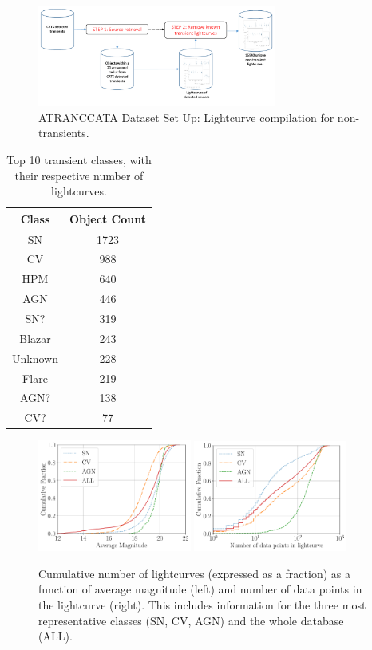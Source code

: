 \documentclass[a4paper,fleqn,usenatbib]{mnras}
\begin{document}
\begin{figure}
	\includegraphics[width=0.7\textwidth]{NonTransients.pdf}
  \caption{ATRANCCATA Dataset Set Up: Lightcurve compilation for non-transients.}
  \label{fig:non-transients}
\end{figure} 

\begin{table}
\centering
\begin{tabular}{c|c}
    \hline
    Class &  Object Count \\
    \hline
SN & 1723 \\
CV & 988 \\
HPM & 640 \\
AGN & 446 \\
SN? & 319 \\
Blazar & 243 \\
Unknown & 228 \\
Flare & 219 \\
AGN? & 138 \\
CV? & 77 \\
    \hline
\end{tabular}
\caption{Top 10 transient classes, with their respective number of
  lightcurves.} 
\label{table:top_classes}
\end{table}


\begin{figure}
	\includegraphics[width=0.45\textwidth]{cumulative_magnitude.pdf}
  \includegraphics[width=0.45\textwidth]{cumulative_classes.pdf}
  \caption{Cumulative number of lightcurves (expressed as a fraction)
    as a function of average magnitude (left) and number of data
    points in the lightcurve (right).
    This includes information for the three most representative
    classes (SN, CV, AGN) and the whole database (ALL).}
  \label{fig:cumulative}
\end{figure} 
\end{document}
